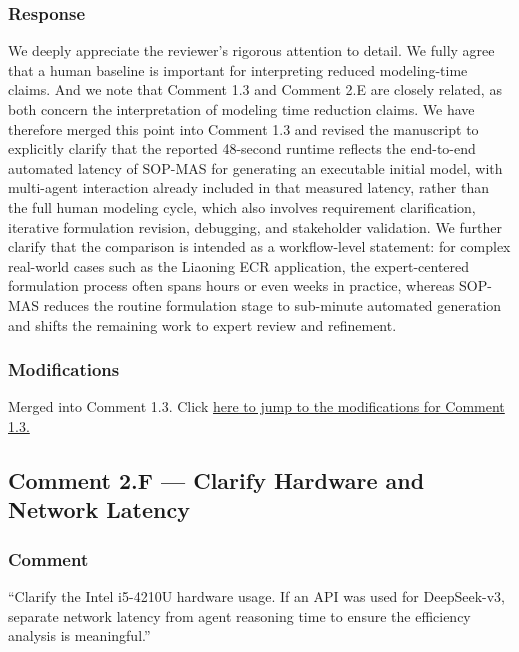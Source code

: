 \documentclass[11pt,a4paper]{article}
\begin{document}
\subsubsection{Response}
We deeply appreciate the reviewer’s rigorous attention to detail. We fully agree that a human baseline is important for interpreting reduced modeling-time claims.
And we note that Comment 1.3 and Comment 2.E are closely related, as both concern the interpretation of modeling time reduction claims. We have therefore merged this point into Comment 1.3 and revised the manuscript to explicitly clarify that the reported 48-second runtime reflects the end-to-end automated latency of SOP-MAS for generating an executable initial model, with multi-agent interaction already included in that measured latency, rather than the full human modeling cycle, which also involves requirement clarification, iterative formulation revision, debugging, and stakeholder validation. We further clarify that the comparison is intended as a workflow-level statement: for complex real-world cases such as the Liaoning ECR application, the expert-centered formulation process often spans hours or even weeks in practice, whereas SOP-MAS reduces the routine formulation stage to sub-minute automated generation and shifts the remaining work to expert review and refinement.

\subsubsection{Modifications}
Merged into Comment 1.3. Click \hyperref[resp:r1.3-modifications]{here to jump to the modifications for Comment 1.3.}

\subsection{Comment 2.F --- Clarify Hardware and Network Latency}

\subsubsection{Comment}
``Clarify the Intel i5-4210U hardware usage. If an API was used for DeepSeek-v3, separate network latency from agent reasoning time to ensure the efficiency analysis is meaningful.''
\end{document}
